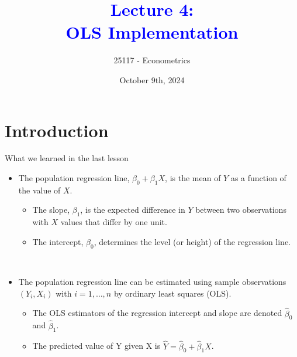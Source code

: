 \documentclass[notes,10pt, aspectratio=169]{beamer}
\title[]{\textcolor{blue}{Lecture 4:\\OLS Implementation}}
\author{25117 - Econometrics}
\institute[shortinst]{Universitat Pompeu Fabra}
\date{October 9th, 2024}
\begin{document}

\begin{frame}[plain]
\maketitle
\end{frame}

\section{Introduction}

\begin{frame}{What we learned in the last lesson}
\begin{itemize}
    \item The population regression line, $\beta_0 + \beta_1 X$, is the mean of $Y$ as a function of the value of $X$.
    \begin{itemize}
        \item The slope, $\beta_1$, is the expected difference in $Y$ between two observations with $X$ values that differ by one unit.
        \item The intercept, $\beta_0$, determines the level (or height) of the regression line.
    \end{itemize} \\[1em]
    \item The population regression line can be estimated using sample observations $(Y_i, X_i)$ with $i = 1, \dots, n$ by ordinary least squares (OLS).
    \begin{itemize}
        \item The OLS estimators of the regression intercept and slope are denoted $\hat{\beta}_0$ and $\hat{\beta}_1$.
        \item The predicted value of Y given X is $\hat{Y}=\hat{\beta}_0 + \hat{\beta}_1 X$.
    \end{itemize} \\[1em]
\end{itemize}
\end{frame}
\end{document}
